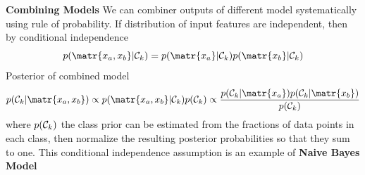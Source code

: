 \documentclass[11pt]{article}
\begin{document}
\begin{defn*}
    \textbf{Combining Models} We can combiner outputs of different model systematically using rule of probability. If distribution of input features are independent, then by conditional independence
    \[
        p(\matr{x_a, x_b} | \calC_k) = p(\matr{x_a} | \calC_k) p(\matr{x_b} | \calC_k)
    \]
    Posterior of combined model 
    \[
        p(\calC_k | \matr{x_a, x_b}) \propto p(\matr{x_a, x_b}|\calC_k) p(\calC_k) \propto 
        \frac{p(\calC_k | \matr{x_a}) p(\calC_k | \matr{x_b})}{p(\calC_k)}
    \]
    where $p(\mathcal{C}_k)$ the class prior can be estimated from the fractions of data points in each class, then normalize the resulting posterior probabilities so that they sum to one. This conditional independence assumption is an example of \textbf{Naive Bayes Model}
\end{defn*}
\end{document}
